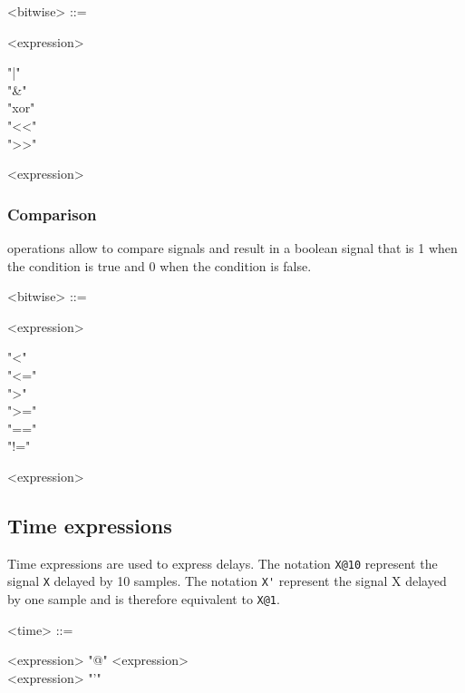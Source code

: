 \documentclass[a4paper]{book}
\begin{document}
\begin{grammar}
  <bitwise> ::= 
  \begin{syntdiag}
    <expression>
    \begin{stack}
      "|" \\ "\&" \\ "xor" \\ "<<" \\ ">>"
    \end{stack}
    <expression>
  \end{syntdiag}
\end{grammar}

\subsubsection{Comparison} operations allow to compare signals and result in a boolean signal that is 1 when the condition is true and 0 when the condition is false.

\begin{grammar}
  <bitwise> ::= 
  \begin{syntdiag}
    <expression>
    \begin{stack}
      "<" \\ "<=" \\ ">" \\ ">=" \\ "==" \\ "!="
    \end{stack}
    <expression>
  \end{syntdiag}
\end{grammar}


\subsection{Time expressions}

Time expressions are used to express delays. The notation \lstinline'X@10' represent the signal \lstinline'X' delayed by 10 samples. The notation \lstinline"X'" represent the signal X delayed by one sample and is therefore equivalent to \lstinline'X@1'.

\begin{grammar}
  <time> ::= 
  \begin{syntdiag}
    \begin{stack}
      <expression> "@" <expression> \\ 
      <expression> "'"
    \end{stack}
  \end{syntdiag}
\end{grammar}
\end{document}
